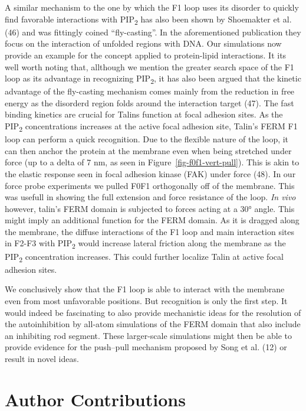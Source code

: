 \documentclass[
  twocolumn]{biophys-new-mod}
\begin{document}
A similar mechanism to the one by which the F1 loop uses its disorder to
quickly find favorable interactions with PIP\textsubscript{2} has also
been shown by Shoemakter et al. (46) and was fittingly coined
``fly-casting''. In the aforementioned publication they focus on the
interaction of unfolded regions with DNA. Our simulations now provide an
example for the concept applied to protein-lipid interactions. It its
well worth noting that, allthough we mention the greater search space of
the F1 loop as its advantage in recognizing PIP\textsubscript{2}, it has
also been argued that the kinetic advantage of the fly-casting mechanism
comes mainly from the reduction in free energy as the disorderd region
folds around the interaction target (47). The fast binding kinetics are
crucial for Talins function at focal adhesion sites. As the
PIP\textsubscript{2} concentrations increases at the active focal
adhesion site, Talin's FERM F1 loop can perform a quick recognition. Due
to the flexible nature of the loop, it can then anchor the protein at
the membrane even when being stretched under force (up to a delta of 7
nm, as seen in Figure~\ref{fig-f0f1-vert-pull}). This is akin to the
elastic response seen in focal adhesion kinase (FAK) under force (48).
In our force probe experiments we pulled F0F1 orthogonally off of the
membrane. This was usefull in showing the full extension and force
resistance of the loop. \emph{In vivo} however, talin's FERM domain is
subjected to forces acting at a 30° angle. This might imply an
additional function for the FERM domain. As it is dragged along the
membrane, the diffuse interactions of the F1 loop and main interaction
sites in F2-F3 with PIP\textsubscript{2} would increase lateral friction
along the membrane as the PIP\textsubscript{2} concentration increases.
This could further localize Talin at active focal adhesion sites.

We conclusively show that the F1 loop is able to interact with the
membrane even from most unfavorable positions. But recognition is only
the first step. It would indeed be fascinating to also provide
mechanistic ideas for the resolution of the autoinhibition by all-atom
simulations of the FERM domain that also include an inhibiting rod
segment. These larger-scale simulations might then be able to provide
evidence for the push--pull mechanism proposed by Song et al. (12) or
result in novel ideas.

\hypertarget{author-contributions}{%
\section{Author Contributions}\label{author-contributions}}
\end{document}
